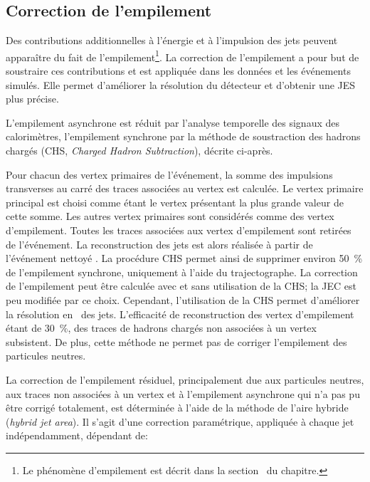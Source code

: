 \subsection{Correction de l'empilement}\label{chapter-JERC-section-CMS-subsec-PU}
Des contributions additionnelles à l'énergie et à l'impulsion des jets peuvent apparaître du fait de l'empilement\footnote{Le phénomène d'empilement est décrit dans la section~ du chapitre.}.
La correction de l'empilement a pour but de soustraire ces contributions et est appliquée dans les données et les événements simulés.
Elle permet d'améliorer la résolution du détecteur et d'obtenir une JES plus précise.
\par L'empilement asynchrone est réduit par l'analyse temporelle des signaux des calorimètres,
l'empilement synchrone par la méthode de soustraction des hadrons chargés (CHS, \emph{Charged Hadron Subtraction}), décrite ci-après.
\par Pour chacun des vertex primaires de l'événement, la somme des impulsions transverses au carré des traces associées au vertex est calculée.
Le vertex primaire principal est choisi comme étant le vertex présentant la plus grande valeur de cette somme.
Les autres vertex primaires sont considérés comme des vertex d'empilement.
Toutes les traces associées aux vertex d'empilement sont retirées de l'événement.
La reconstruction des jets est alors réalisée à partir de l'événement \og nettoyé \fg.
La procédure CHS permet ainsi de supprimer environ \SI{50}{\%} de l'empilement synchrone, uniquement à l'aide du trajectographe.
La correction de l'empilement peut être calculée avec et sans utilisation de la CHS; la JEC est peu modifiée par ce choix. Cependant, l'utilisation de la CHS permet d'améliorer la résolution en \pT\ des jets.
L'efficacité de reconstruction des vertex d'empilement étant de \SI{30}{\%}, des traces de hadrons chargés non associées à un vertex subsistent.
De plus, cette méthode ne permet pas de corriger l'empilement des particules neutres.
\par La correction de l'empilement résiduel, principalement due aux particules neutres, aux traces non associées à un vertex et à l'empilement asynchrone qui n'a pas pu être corrigé totalement, est déterminée à l'aide de la méthode de l'aire hybride (\emph{hybrid jet area}).
Il s'agit d'une correction paramétrique, appliquée à chaque jet indépendamment, dépendant de:
